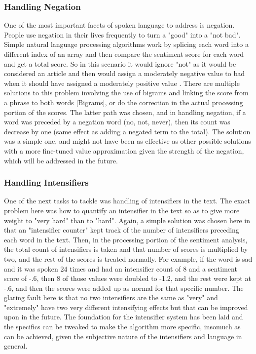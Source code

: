 \documentclass[acmtog, review, screen]{acmart}
\begin{document}
\subsubsection{Handling Negation}
One of the most important facets of spoken language to address is negation.
People use negation in their lives frequently to turn a "good" into a "not bad".
Simple natural language processing algorithms work by splicing each word into a different index of an array and then compare the sentiment score for each word and get a total score.
So in this scenario it would ignore "not" as it would be considered an article and then would assign a moderately negative value to bad when it should have assigned a moderately positive value \cite{sentimentanalysis}.
There are multiple solutions to this problem involving the use of bigrams and linking the score from a phrase to both words [Bigrams], or do the correction in the actual processing portion of the scores.
The latter path was chosen, and in handling negation, if a word was preceded by a negation word (no, not, never), then its count was decrease by one (same effect as adding a negated term to the total).
The solution was a simple one, and might not have been as effective as other possible solutions with a more fine-tuned value approximation given the strength of the negation, which will be addressed in the future.

\subsubsection{Handling Intensifiers}
One of the next tasks to tackle was handling of intensifiers in the text.
The exact problem here was how to quantify an intensifier in the text so as to give more weight to "very hard" than to "hard".
Again, a simple solution was chosen here in that an "intensifier counter" kept track of the number of intensifiers preceding each word in the text.
Then, in the processing portion of the sentiment analysis, the total count of intensifiers is taken and that number of scores is multiplied by two, and the rest of the scores is treated normally.
For example, if the word is sad and it was spoken 24 times and had an intensifier count of 8 and a sentiment score of -.6, then 8 of those values were doubled to -1.2, and the rest were kept at -.6, and then the scores were added up as normal for that specific number.
The glaring fault here is that no two intensifiers are the same as "very" and "extremely" have two very different intensifying effects but that can be improved upon in the future.
The foundation for the intensifier system has been laid and the specifics can be tweaked to make the algorithm more specific, insomuch as can be achieved, given the subjective nature of the intensifiers and language in general.
\end{document}
